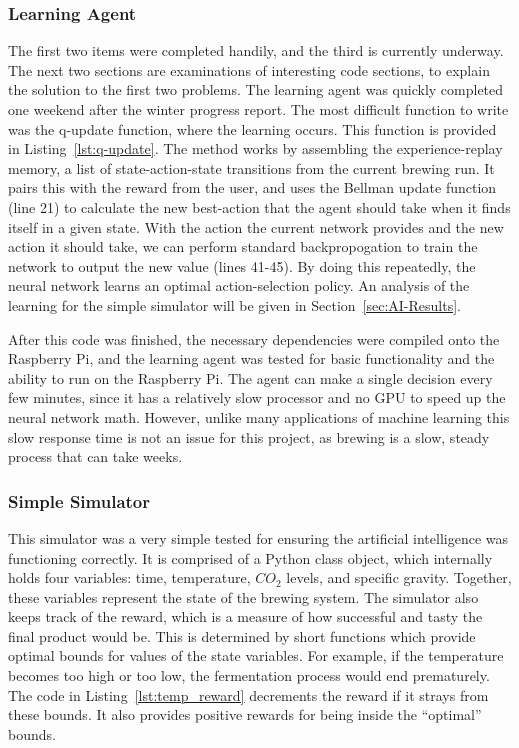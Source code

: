 \documentclass[draftclsnofoot,onecolumn,letterpaper,10pt]{IEEEtran}
\begin{document}
\subsubsection{Learning Agent}
The first two items were completed handily, and the third is currently underway. The next two sections are examinations of interesting code sections, to explain the solution to the first two problems.
The learning agent was quickly completed one weekend after the winter progress report. The most difficult function to write was the q-update function, where the learning occurs. This function is provided in Listing~\ref{lst:q-update}.
\label{lst:q-update}
The method works by assembling the experience-replay memory, a list of state-action-state transitions from the current brewing run. It pairs this with the reward from the user, and uses the Bellman update function (line 21) to calculate the new best-action that the agent should take when it finds itself in a given state. With the action the current network provides and the new action it should take, we can perform standard backpropogation to train the network to output the new value (lines 41-45). By doing this repeatedly, the neural network learns an optimal action-selection policy. An analysis of the learning for the simple simulator will be given in Section~\ref{sec:AI-Results}.

After this code was finished, the necessary dependencies were compiled onto the Raspberry Pi, and the learning agent was tested for basic functionality and the ability to run on the Raspberry Pi. The agent can make a single decision every few minutes, since it has a relatively slow processor and no GPU to speed up the neural network math. However, unlike many applications of machine learning this slow response time is not an issue for this project, as brewing is a slow, steady process that can take weeks.

\subsubsection{Simple Simulator}
This simulator was a very simple tested for ensuring the artificial intelligence was functioning correctly. It is comprised of a Python class object, which internally holds four variables: time, temperature, $CO_2$ levels, and specific gravity. Together, these variables represent the state of the brewing system. The simulator also keeps track of the reward, which is a measure of how successful and tasty the final product would be. This is determined by short functions which provide optimal bounds for values of the state variables. For example, if the temperature becomes too high or too low, the fermentation process would end prematurely. The code in Listing~\ref{lst:temp_reward} decrements the reward if it strays from these bounds. It also provides positive rewards for being inside the ``optimal'' bounds.
\label{lst:temp_reward}
\end{document}
